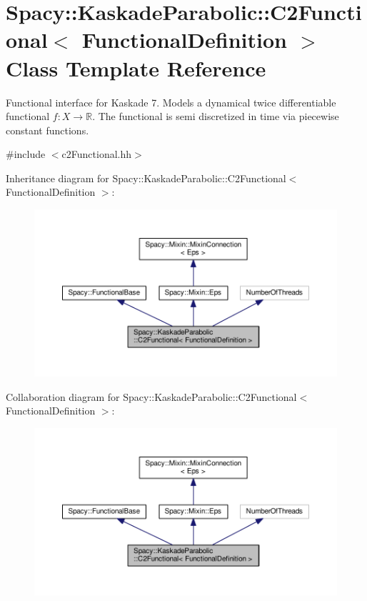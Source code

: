 \hypertarget{classSpacy_1_1KaskadeParabolic_1_1C2Functional}{\section{Spacy\-:\-:Kaskade\-Parabolic\-:\-:C2\-Functional$<$ Functional\-Definition $>$ Class Template Reference}
\label{classSpacy_1_1KaskadeParabolic_1_1C2Functional}
}


Functional interface for Kaskade 7. Models a dynamical twice differentiable functional $f:X\rightarrow \mathbb{R}$. The functional is semi discretized in time via piecewise constant functions.  




{\ttfamily \#include $<$c2\-Functional.\-hh$>$}



Inheritance diagram for Spacy\-:\-:Kaskade\-Parabolic\-:\-:C2\-Functional$<$ Functional\-Definition $>$\-:
\nopagebreak
\begin{figure}[H]
\begin{center}
\leavevmode
\includegraphics[width=350pt]{classSpacy_1_1KaskadeParabolic_1_1C2Functional__inherit__graph}
\end{center}
\end{figure}


Collaboration diagram for Spacy\-:\-:Kaskade\-Parabolic\-:\-:C2\-Functional$<$ Functional\-Definition $>$\-:
\nopagebreak
\begin{figure}[H]
\begin{center}
\leavevmode
\includegraphics[width=350pt]{classSpacy_1_1KaskadeParabolic_1_1C2Functional__coll__graph}
\end{center}
\end{figure}
